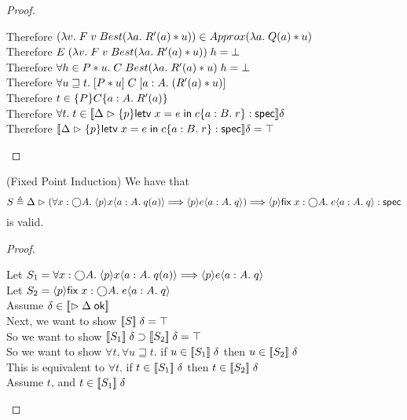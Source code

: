 \begin{proof}
\begin{tabbedproof}
    \ooooooo Therefore $(\lambda v.\;F\;v\;Best(\lambda a.\;R'(a)*u)) \in Approx(\lambda a.\;Q(a) * u)$ \\                        
    \ooooooo Therefore $E\;(\lambda v.\;F\;v\;Best(\lambda a.\;R'(a)*u))\;h = \bot$ \\
    \oooooo Therefore $\forall h \in P * u.\; C\;Best(\lambda a.\;R'(a) * u)\;h = \bot$\\
    \ooooo Therefore $\forall u \sqsupseteq t.\; [{P * u}]\;{C}\;[{a:A}.\;{(R'(a) * u)}]$ \\
    \ooooo Therefore $t \in \{{P}\}{C}\{{a:A}.\;{R'(a)}\}$ \\
    \oooo Therefore $\forall t.\; t \in [\![{{\Delta} \vartriangleright {\{{p}\}{\mathsf{letv}\;x = e\;\mathsf{in}\;c}\{{a:B}.\;{r}\}} : \mathsf{spec}}]\!]\delta$ \\
    \oooo Therefore $[\![{{\Delta} \vartriangleright {\{{p}\}{\mathsf{letv}\;x = e\;\mathsf{in}\;c}\{{a:B}.\;{r}\}} : \mathsf{spec}}]\!]\delta = \top$\\
  \end{tabbedproof}
\end{proof}

\begin{lemma}{(Fixed Point Induction)}
We have that
\begin{displaymath}
   S \triangleq 
   {\Delta} \vartriangleright {(\forall x:\bigcirc{A}.\; \langle{p}\rangle{x}\langle{a:A}.\;{q(a)}\rangle \Longrightarrow\langle{p}\rangle{e}\langle{a:A}.\;{q}\rangle)
    \Longrightarrow\langle{p}\rangle{\mathsf{fix}\;{x:\bigcirc{A}}.\;{e}}\langle{a:A}.\;{q}\rangle} : \mathsf{spec}
\end{displaymath}
\noindent is valid.
\end{lemma}

\begin{proof}
  \begin{tabbedproof}
    \oo Let $S_1 = \forall x:\bigcirc{A}.\; \langle{p}\rangle{x}\langle{a:A}.\;{q(a)}\rangle \Longrightarrow \langle{p}\rangle{e}\langle{a:A}.\;{q}\rangle$\\
    \oo Let $S_2 = \langle{p}\rangle{\mathsf{fix}\;{x:\bigcirc{A}}.\;{e}}\langle{a:A}.\;{q}\rangle$ \\
    \oo Assume $\delta \in [\![{\vartriangleright {\Delta} \;\mathsf{ok}}]\!]$ \\
    \ooo Next, we want to show $[\![{S}]\!]\;\delta = \top$ \\
    \ooo So we want to show $[\![{S_1}]\!]\;\delta \supset [\![{S_2}]\!]\;\delta = \top$ \\
    \ooo So we want to show $\forall t, \forall u \sqsupseteq t.$ if $u \in [\![{S_1}]\!]\;\delta$ then $u \in [\![{S_2}]\!]\;\delta$ \\
    \ooo This is equivalent to $\forall t.$ if $t \in [\![{S_1}]\!]\;\delta$ then $t \in [\![{S_2}]\!]\;\delta$ \\
    \ooo Assume $t$, and $t \in [\![{S_1}]\!]\;\delta$ \\
    \ooo 
  \end{tabbedproof}
\end{proof}

